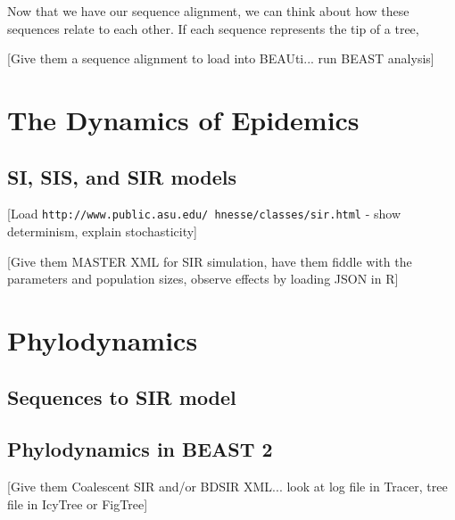 \documentclass{scrartcl}
\begin{document}
Now that we have our sequence alignment, we can think about how these sequences relate to each other.  If each sequence represents the tip of a tree,

\vspace{2mm}
[Give them a sequence alignment to load into BEAUti... run BEAST analysis]

\section{The Dynamics of Epidemics}

\subsection{SI, SIS, and SIR models}

[Load \texttt{http://www.public.asu.edu/~hnesse/classes/sir.html} - show determinism, explain stochasticity]

[Give them MASTER XML for SIR simulation, have them fiddle with the parameters and population sizes, observe effects by loading JSON in R]

\section{Phylodynamics}

\subsection{Sequences to SIR model}

\subsection{Phylodynamics in BEAST 2}

[Give them Coalescent SIR and/or BDSIR XML... look at log file in Tracer, tree file in IcyTree or FigTree]

\newpage
\begin{thebibliography}{99} %

 
\end{thebibliography}

\end{document}

